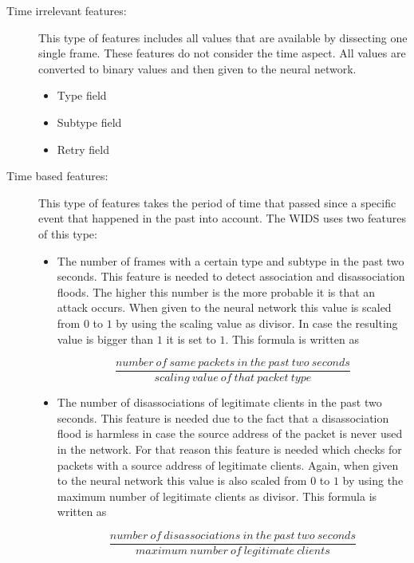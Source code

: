 \begin{description}
    \item[Time irrelevant features:] This type of features includes all values that are available by dissecting one single frame. These features do not consider the time aspect. All values are converted to binary values and then given to the neural network.

	\begin{itemize}
	    \item Type field
		\item Subtype field
		\item Retry field
	\end{itemize}

    \item[Time based features:] This type of features takes the period of time that passed since a specific event that happened in the past into account. The WIDS uses two features of this type:

	\begin{itemize}
		\item The number of frames with a certain type and subtype in the past two seconds. This feature is needed to detect association and disassociation floods. The higher this number is the more probable it is that an attack occurs. When given to the neural network this value is scaled from $0$ to $1$ by using the scaling value as divisor. In case the resulting value is bigger than $1$ it is set to $1$. This formula is written as

\begin{equation}
\frac{number\ of\ same\ packets\ in\ the\ past\ two\ seconds}{scaling\ value\ of\ that\ packet\ type}
\end{equation}
\vspace{-0.5em}
		\item The number of disassociations of legitimate clients in the past two seconds. This feature is needed due to the fact that a disassociation flood is harmless in case the source address of the packet is never used in the network. For that reason this feature is needed which checks for packets with a source address of legitimate clients. Again, when given to the neural network this value is also scaled from $0$ to $1$ by using the maximum number of legitimate clients as divisor. This formula is written as

\begin{equation}
\frac{number\ of\ disassociations\ in\ the\ past\ two\ seconds}{maximum\ number\ of\ legitimate\ clients}
\end{equation}


	\end{itemize}

\end{description}

